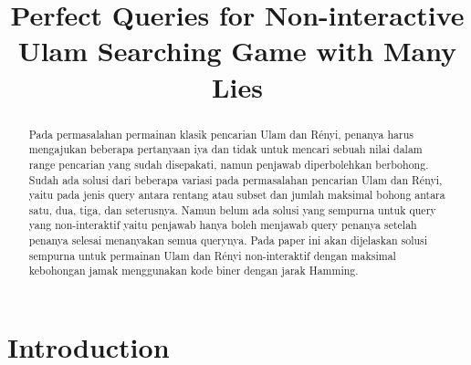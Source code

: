 \documentclass[conference,compsoc]{IEEEtran}
\begin{document}
\title{Perfect Queries for Non-interactive\\Ulam Searching Game with Many Lies}

\author{
}

\maketitle

\begin{abstract}
Pada permasalahan permainan klasik pencarian Ulam dan Rényi, penanya harus mengajukan beberapa pertanyaan iya dan tidak untuk mencari sebuah nilai dalam range pencarian yang sudah disepakati, namun penjawab diperbolehkan berbohong. Sudah ada solusi dari beberapa variasi pada permasalahan pencarian Ulam dan Rényi, yaitu pada jenis query antara rentang atau subset dan jumlah maksimal bohong antara satu, dua, tiga, dan seterusnya. Namun belum ada solusi yang sempurna untuk query yang non-interaktif yaitu penjawab hanya boleh menjawab query penanya setelah penanya selesai menanyakan semua querynya. Pada paper ini akan dijelaskan solusi sempurna untuk permainan Ulam dan Rényi non-interaktif dengan maksimal kebohongan jamak menggunakan kode biner dengan jarak Hamming.
\end{abstract}

\IEEEpeerreviewmaketitle

\section{Introduction}
\end{document}
